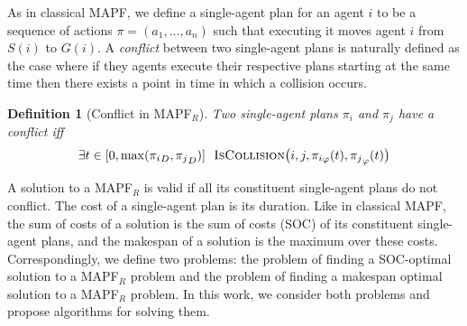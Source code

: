 \documentclass[review]{elsarticle}
\newtheorem{definition}{Definition}
\newcommand{\target}{\ensuremath{G}\xspace}
\newcommand{\source}{\ensuremath{S}\xspace}
\newcommand\konstantin[1]{\nb{\textbf{Konstantin:}}{red}{#1}}
\newcommand\roni[1]{\nb{\textbf{Roni:}}{green}{#1}}
\newcommand{\mapfr}{\ac{MAPF}$_R$\xspace}
\newcommand{\mapf}{\ac{MAPF}\xspace}
\newcommand{\iscollision}{\textsc{IsCollision}\xspace}
\begin{document}



As in classical \mapf, we define a single-agent plan for an agent $i$ to be a sequence of actions $\pi=(a_1,\ldots, a_n)$ 
such that executing it moves agent $i$ from $\source(i)$ to $\target(i)$. 
A \emph{conflict} between two single-agent plans is naturally defined as the case where if they agents execute their respective plans starting at the same time then there exists a point in time in which a collision occurs. 

\begin{definition}[Conflict in \mapfr]
Two single-agent plans $\pi_i$ and $\pi_j$ have a conflict iff 
\begin{equation}
    \exists t\in [0, \max({\pi_i}_D,{\pi_j}_D)] 
        ~~ \iscollision\big(i,j,{\pi_i}_\varphi(t), {\pi_j}_\varphi(t)\big)
\end{equation}
\label{def:conflict-mapfr}
\end{definition}





A solution to a \mapfr is valid if all its constituent single-agent plans do not conflict. The cost of a single-agent plan is its duration. Like in classical \mapf, the sum of costs of a solution is the sum of costs (SOC) of its constituent single-agent plans, and the makespan of a solution is the maximum over these costs. 
Correspondingly, we define two problems: 
the problem of finding a SOC-optimal solution to a \mapfr problem and the problem of finding a makespan optimal solution to a \mapfr problem. In this work, we 
consider both problems and propose algorithms for solving them. 
\end{document}

